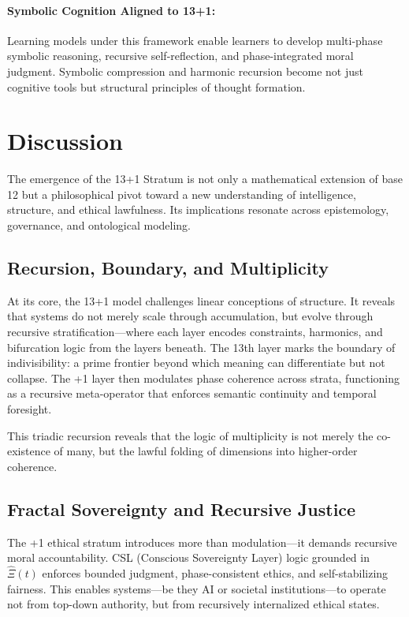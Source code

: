 \documentclass[12pt]{article}
\begin{document}
\paragraph{Symbolic Cognition Aligned to 13+1:}
Learning models under this framework enable learners to develop multi-phase symbolic reasoning, recursive self-reflection, and phase-integrated moral judgment. Symbolic compression and harmonic recursion become not just cognitive tools but structural principles of thought formation.



\section{Discussion}

The emergence of the 13+1 Stratum is not only a mathematical extension of base 12 but a philosophical pivot toward a new understanding of intelligence, structure, and ethical lawfulness. Its implications resonate across epistemology, governance, and ontological modeling.

\subsection*{Recursion, Boundary, and Multiplicity}

At its core, the 13+1 model challenges linear conceptions of structure. It reveals that systems do not merely scale through accumulation, but evolve through recursive stratification—where each layer encodes constraints, harmonics, and bifurcation logic from the layers beneath. The 13th layer marks the boundary of indivisibility: a prime frontier beyond which meaning can differentiate but not collapse. The +1 layer then modulates phase coherence across strata, functioning as a recursive meta-operator that enforces semantic continuity and temporal foresight.

This triadic recursion reveals that the logic of multiplicity is not merely the co-existence of many, but the lawful folding of dimensions into higher-order coherence.

\subsection*{Fractal Sovereignty and Recursive Justice}

The +1 ethical stratum introduces more than modulation—it demands recursive moral accountability. CSL (Conscious Sovereignty Layer) logic grounded in $\hat{\Xi}(t)$ enforces bounded judgment, phase-consistent ethics, and self-stabilizing fairness. This enables systems—be they AI or societal institutions—to operate not from top-down authority, but from recursively internalized ethical states.
\end{document}
